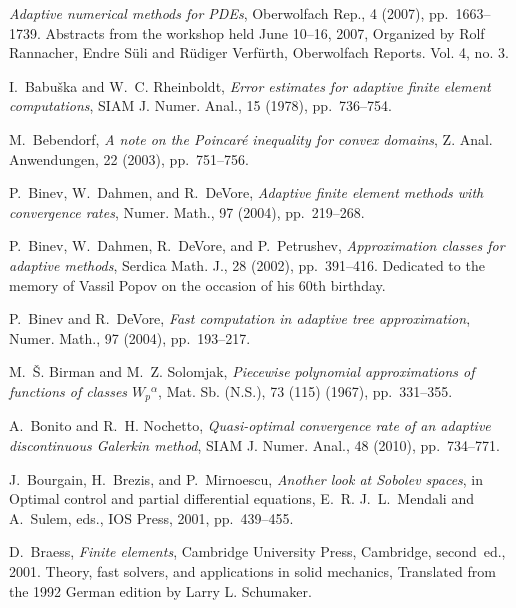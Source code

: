 \documentclass[a4paper]{amsart}
\numberwithin{equation}{section}
\theoremstyle{plain}
\theoremstyle{definition}
\begin{document}
\begin{thebibliography}{10}

{\em Adaptive numerical methods for {PDE}s}, Oberwolfach Rep., 4 (2007),
  pp.~1663--1739.
\newblock Abstracts from the workshop held June 10--16, 2007, Organized by Rolf
  Rannacher, Endre S{\"u}li and R{\"u}diger Verf{\"u}rth, Oberwolfach Reports.
  Vol. 4, no. 3.

{\sc I.~Babu{\v{s}}ka and W.~C. Rheinboldt}, {\em Error estimates for adaptive
  finite element computations}, SIAM J. Numer. Anal., 15 (1978), pp.~736--754.

{\sc M.~Bebendorf}, {\em A note on the {P}oincar{\'e} inequality for convex
  domains}, Z. Anal. Anwendungen, 22 (2003), pp.~751--756.

{\sc P.~Binev, W.~Dahmen, and R.~DeVore}, {\em Adaptive finite element methods
  with convergence rates}, Numer. Math., 97 (2004), pp.~219--268.

{\sc P.~Binev, W.~Dahmen, R.~DeVore, and P.~Petrushev}, {\em Approximation
  classes for adaptive methods}, Serdica Math. J., 28 (2002), pp.~391--416.
\newblock Dedicated to the memory of Vassil Popov on the occasion of his 60th
  birthday.

{\sc P.~Binev and R.~DeVore}, {\em Fast computation in adaptive tree
  approximation}, Numer. Math., 97 (2004), pp.~193--217.

{\sc M.~{\v{S}}. Birman and M.~Z. Solomjak}, {\em Piecewise polynomial
  approximations of functions of classes {$W_{p}{}^{\alpha }$}}, Mat. Sb.
  (N.S.), 73 (115) (1967), pp.~331--355.

{\sc A.~Bonito and R.~H. Nochetto}, {\em Quasi-optimal convergence rate of an
  adaptive discontinuous {G}alerkin method}, SIAM J. Numer. Anal., 48 (2010),
  pp.~734--771.

{\sc J.~Bourgain, H.~Brezis, and P.~Mirnoescu}, {\em Another look at {S}obolev
  spaces}, in Optimal control and partial differential equations, E.~R.
  J.~L.~Mendali and A.~Sulem, eds., IOS Press, 2001, pp.~439--455.

{\sc D.~Braess}, {\em Finite elements}, Cambridge University Press, Cambridge,
  second~ed., 2001.
\newblock Theory, fast solvers, and applications in solid mechanics, Translated
  from the 1992 German edition by Larry L. Schumaker.


\end{thebibliography}
\end{document}

